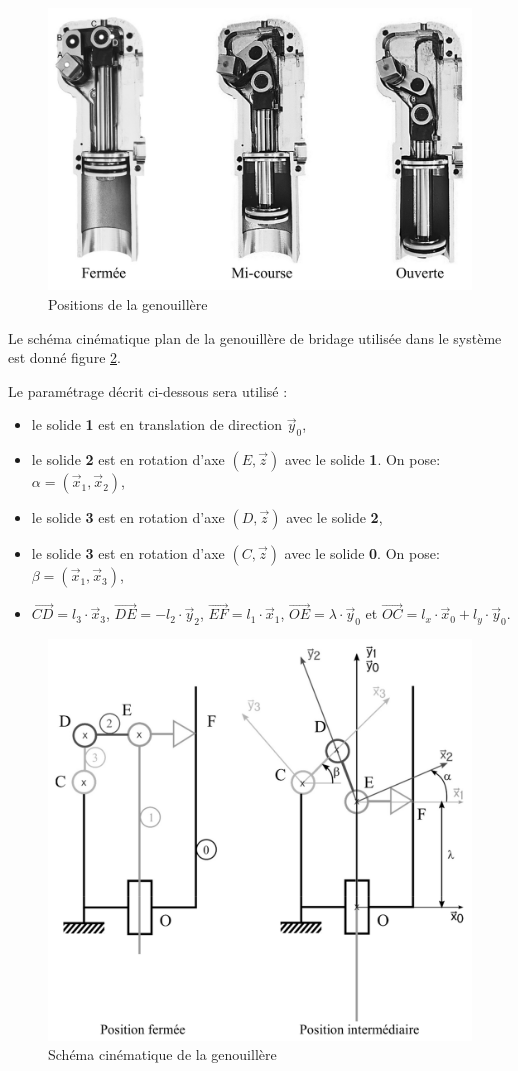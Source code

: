\begin{figure}[!h]
\centering\includegraphics[width=0.6\linewidth]{img/fig12}
 \caption{Positions de la genouillère}
 \label{img12}
\end{figure}

\newpage

Le schéma cinématique plan de la genouillère de bridage utilisée dans le système est donné figure \ref{img13}.

Le paramétrage décrit ci-dessous sera utilisé :
\begin{itemize}
 \item le solide \textbf{1} est en translation de direction $\vec{y}_0$,
 \item le solide \textbf{2} est en rotation d'axe $(E,\vec{z})$ avec le solide \textbf{1}. On pose: $\alpha=(\vec{x}_1,\vec{x}_2)$,
 \item le solide \textbf{3} est en rotation d'axe $(D,\vec{z})$ avec le solide \textbf{2},
 \item le solide \textbf{3} est en rotation d'axe $(C,\vec{z})$ avec le solide \textbf{0}. On pose: $\beta=(\vec{x}_1,\vec{x}_3)$,
 \item $\overrightarrow{CD}=l_3\cdot\vec{x}_3$, $\overrightarrow{DE}=-l_2\cdot\vec{y}_2$, $\overrightarrow{EF}=l_1\cdot\vec{x}_1$, $\overrightarrow{OE}=\lambda\cdot\vec{y}_0$ et $\overrightarrow{OC}=l_x\cdot\vec{x}_0+l_y\cdot\vec{y}_0$.
\end{itemize}

\begin{figure}[!h]
\centering\includegraphics[width=0.65\linewidth]{img/fig13}
 \caption{Schéma cinématique de la genouillère}
 \label{img13}
\end{figure}

